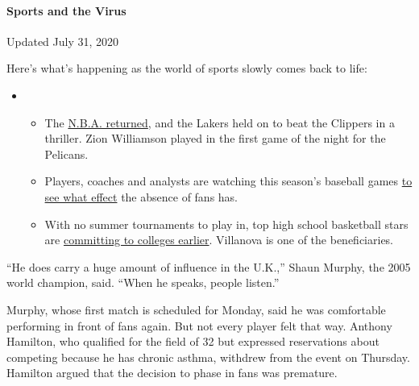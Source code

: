 \hypertarget{sports-and-the-virus}{%
\paragraph{Sports and the Virus}\label{sports-and-the-virus}}

Updated July 31, 2020

Here's what's happening as the world of sports slowly comes back to
life:

\begin{itemize}
\item
  \begin{itemize}
  \tightlist
  \item
    The
    \href{https://www.nytimes3xbfgragh.onion/2020/07/30/sports/basketball/clippers-lakers.html?action=click\&pgtype=Article\&state=default\&region=MAIN_CONTENT_2\&context=storylines_keepup}{N.B.A.
    returned}, and the Lakers held on to beat the Clippers in a
    thriller. Zion Williamson played in the first game of the night for
    the Pelicans.
  \item
    Players, coaches and analysts are watching this season's baseball
    games
    \href{https://www.nytimes3xbfgragh.onion/2020/07/31/sports/baseball/baseball-empty-stadiums-effects.html?action=click\&pgtype=Article\&state=default\&region=MAIN_CONTENT_2\&context=storylines_keepup}{to
    see what effect} the absence of fans has.
  \item
    With no summer tournaments to play in, top high school basketball
    stars are
    \href{https://www.nytimes3xbfgragh.onion/2020/07/30/sports/ncaabasketball/college-basketball-recruiting.html?action=click\&pgtype=Article\&state=default\&region=MAIN_CONTENT_2\&context=storylines_keepup}{committing
    to colleges earlier}. Villanova is one of the beneficiaries.
  \end{itemize}
\end{itemize}

``He does carry a huge amount of influence in the U.K.,'' Shaun Murphy,
the 2005 world champion, said. ``When he speaks, people listen.''

Murphy, whose first match is scheduled for Monday, said he was
comfortable performing in front of fans again. But not every player felt
that way. Anthony Hamilton, who qualified for the field of 32 but
expressed reservations about competing because he has chronic asthma,
withdrew from the event on Thursday. Hamilton argued that the decision
to phase in fans was premature.

